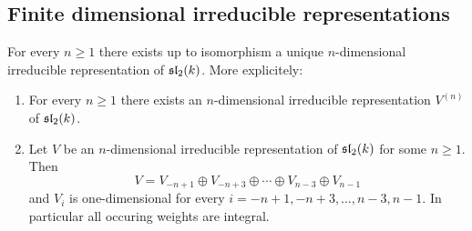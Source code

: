 \subsection{Finite dimensional irreducible representations}


\begin{thrm}
 For every $n \geq 1$ there exists up to isomorphism a unique $n$-dimensional irreducible representation of $\mathfrak{sl}_2(k)$. More explicitely:
 \begin{enumerate}[leftmargin=*]
  \item
   For every $n \geq 1$ there exists an $n$-dimensional irreducible representation $V^{(n)}$ of $\mathfrak{sl}_2(k)$.
  \item
   Let $V$ be an $n$-dimensional irreducible representation of $\mathfrak{sl}_2(k)$ for some $n \geq 1$. Then
   \[
    V = V_{-n+1} \oplus V_{-n+3} \oplus \dotsb \oplus V_{n-3} \oplus V_{n-1}
   \]
   and $V_i$ is one-dimensional for every $i = -n+1, -n+3, \dotsc, n-3, n-1$. In particular all occuring weights are integral.
   

\end{enumerate}
\end{thrm}
